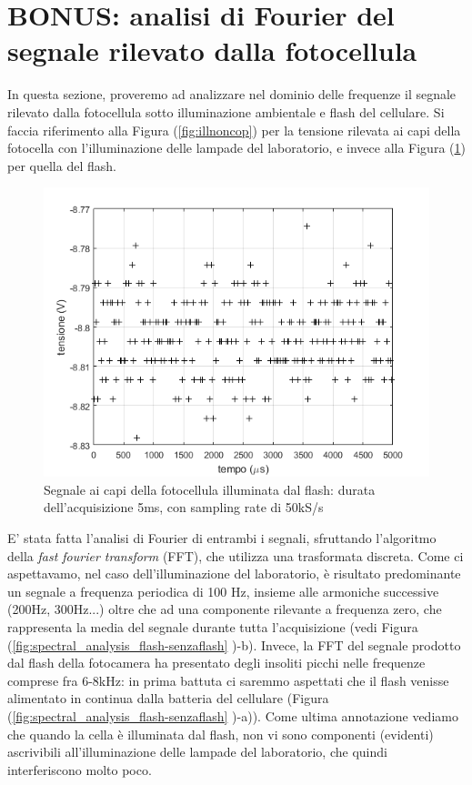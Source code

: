 \documentclass[journal, a4paper]{IEEEtran}
\begin{document}
\section{BONUS: analisi di Fourier del segnale rilevato dalla fotocellula}
In questa sezione, proveremo ad analizzare nel dominio delle frequenze il segnale rilevato dalla fotocellula sotto illuminazione ambientale e flash del cellulare. Si faccia riferimento alla Figura (\ref{fig:illnoncop}) per la tensione rilevata ai capi della fotocella con l'illuminazione delle lampade del laboratorio, e invece alla Figura (\ref{fig:es4_flash_0-005_50k}) per quella del flash. \\

\begin{figure}
\centering
\includegraphics[width=0.8\linewidth]{./es4_flash_0-005_50k}
\caption{Segnale ai capi della fotocellula illuminata dal flash: durata dell'acquisizione 5ms, con sampling rate di 50kS/s}
\label{fig:es4_flash_0-005_50k}
\end{figure}

E' stata fatta l'analisi di Fourier di entrambi i segnali, sfruttando l'algoritmo della \textit{fast fourier transform} (FFT), che utilizza una trasformata discreta. Come ci aspettavamo, nel caso dell'illuminazione del laboratorio, è risultato predominante un segnale a frequenza periodica di 100 Hz, insieme alle armoniche successive (200Hz, 300Hz...) oltre che ad una componente rilevante a frequenza zero, che rappresenta la media del segnale durante tutta l'acquisizione (vedi Figura (\ref{fig:spectral_analysis_flash-senzaflash} )-b). Invece, la FFT del segnale prodotto dal flash della fotocamera ha presentato degli insoliti picchi nelle frequenze comprese fra 6-8kHz: in prima battuta ci saremmo aspettati che il flash venisse alimentato in continua dalla batteria del cellulare (Figura (\ref{fig:spectral_analysis_flash-senzaflash} )-a)). Come ultima annotazione vediamo che quando la cella è illuminata dal flash, non vi sono componenti (evidenti) ascrivibili all'illuminazione delle lampade del laboratorio, che quindi interferiscono molto poco.
\end{document}
